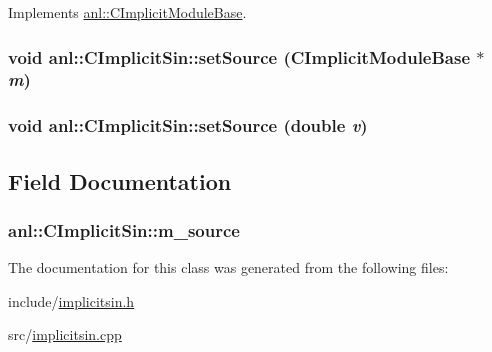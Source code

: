 Implements \hyperlink{classanl_1_1CImplicitModuleBase_ab88f8a1822dcfbc13ba5230318b0acd1}{anl::CImplicitModuleBase}.\hypertarget{classanl_1_1CImplicitSin_ad58f4c0bcfcc0ba251c659aa131ce119}{
\subsubsection[{setSource}]{\setlength{\rightskip}{0pt plus 5cm}void anl::CImplicitSin::setSource ({\bf CImplicitModuleBase} $\ast$ {\em m})}}
\label{classanl_1_1CImplicitSin_ad58f4c0bcfcc0ba251c659aa131ce119}
\hypertarget{classanl_1_1CImplicitSin_a42510c2ba672d40fc8e4988da6aca99c}{
\subsubsection[{setSource}]{\setlength{\rightskip}{0pt plus 5cm}void anl::CImplicitSin::setSource (double {\em v})}}
\label{classanl_1_1CImplicitSin_a42510c2ba672d40fc8e4988da6aca99c}


\subsection{Field Documentation}
\hypertarget{classanl_1_1CImplicitSin_a52a087c6a69b0a7c6c0cbc8e7651b0f7}{
\subsubsection[{m\_\-source}]{ {\bf anl::CImplicitSin::m\_\-source}}}
\label{classanl_1_1CImplicitSin_a52a087c6a69b0a7c6c0cbc8e7651b0f7}


The documentation for this class was generated from the following files:\begin{DoxyCompactItemize}
\item 
include/\hyperlink{implicitsin_8h}{implicitsin.h}\item 
src/\hyperlink{implicitsin_8cpp}{implicitsin.cpp}\end{DoxyCompactItemize}

